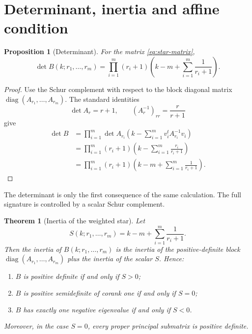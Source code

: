 \documentclass[11pt,a4paper]{article}
\newcommand{\diag}{\operatorname{diag}}
\theoremstyle{definition}
\theoremstyle{plain}
\newtheorem{proposition}[definition]{Proposition}
\newtheorem{theorem}[definition]{Theorem}
\begin{document}
\section{Determinant, inertia and affine condition}
\label{sec:det-inertia}

\begin{proposition}[Determinant]
For the matrix \eqref{eq:star-matrix},
\begin{equation}
\det B(k;r_1,\ldots,r_m)=
\prod_{i=1}^m (r_i+1)\left(k-m+\sum_{i=1}^m \frac{1}{r_i+1}\right).
\label{eq:determinant}
\end{equation}
\end{proposition}

\begin{proof}
Use the Schur complement with respect to the block diagonal matrix $\diag(A_{r_1},\ldots,A_{r_m})$.  The standard identities
\[
\det A_r=r+1,\qquad (A_r^{-1})_{rr}=\frac{r}{r+1}
\]
give
\begin{align*}
\det B
&=\prod_{i=1}^m \det A_{r_i}\left(k-\sum_{i=1}^m v_i^t A_{r_i}^{-1}v_i\right)\\
&=\prod_{i=1}^m (r_i+1)\left(k-\sum_{i=1}^m\frac{r_i}{r_i+1}\right)\\
&=\prod_{i=1}^m (r_i+1)\left(k-m+\sum_{i=1}^m\frac{1}{r_i+1}\right).
\end{align*}
\end{proof}

The determinant is only the first consequence of the same calculation.  The full signature is controlled by a scalar Schur complement.

\begin{theorem}[Inertia of the weighted star]
Let
\begin{equation}
        S(k;r_1,\ldots,r_m)=k-m+\sum_{i=1}^m\frac{1}{r_i+1}.
\label{eq:schur-scalar}
\end{equation}
Then the inertia of $B(k;r_1,\ldots,r_m)$ is the inertia of the positive-definite block $\diag(A_{r_1},\ldots,A_{r_m})$ plus the inertia of the scalar $S$.  Hence:
\begin{enumerate}[label=\textup{(\roman*)}]
\item $B$ is positive definite if and only if $S>0$;
\item $B$ is positive semidefinite of corank one if and only if $S=0$;
\item $B$ has exactly one negative eigenvalue if and only if $S<0$.
\end{enumerate}
Moreover, in the case $S=0$, every proper principal submatrix is positive definite.
\end{theorem}
\end{document}
